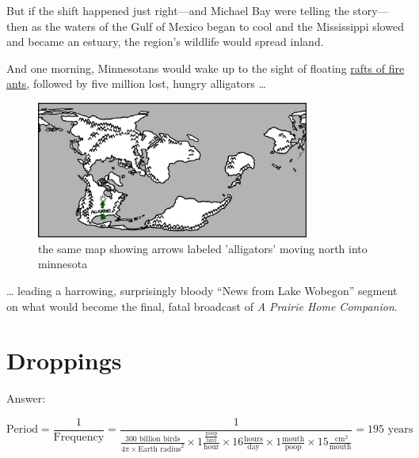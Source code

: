 {But if the shift happened just right—and Michael Bay were telling the story—then as the waters of the Gulf of Mexico began to cool and the Mississippi slowed and became an estuary, the region’s wildlife would spread inland.}

{And one morning, Minnesotans would wake up to the sight of floating \href{http://news.nationalgeographic.com/news/2011/04/pictures/110425-fire-ants-life-rafts-swarms-science-proceedings/}{rafts of fire ants}, followed by five million lost, hungry alligators …}

\begin{figure}[!htbp]
\centering
\includegraphics[scale=0.5, max width=0.8\textwidth]{imgs/a/10/cassini_alligators.png}
\caption{the same map showing arrows labeled 'alligators' moving north into minnesota}
\end{figure}

{… leading a harrowing, surprisingly bloody “News from Lake Wobegon” segment on what would become the final, fatal broadcast of \emph{A Prairie Home Companion}.}

{
\chapter{Droppings}
}

\hfill{}

{Answer:}

{\[\text{Period}=\frac{1}{\text{Frequency}}=\frac{1}{\frac{300\text{ billion birds}}{4\pi\times\text{Earth radius}^2}\times 1\frac{\frac{\text{poop}}{\text{bird}}}{\text{hour}}\times16\frac{\text{hours}}{\text{day}}\times 1\frac{\text{mouth}}{\text{poop}}\times 15\frac{\text{ cm}^2}{\text{mouth}}}=195\text{ years}\]}

